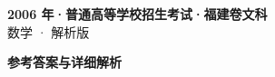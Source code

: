 \documentclass[zihao=-4, a4paper]{ctexart}
\begin{document}
\begin{center}
  {\Large\bfseries 2006 年·普通高等学校招生考试·福建卷文科}\\[4pt]
  {\large 数学 · 解析版}
\end{center}
\medskip
{}

\clearpage
{}
\begin{center}{\Large\bfseries 参考答案与详细解析}\end{center}
\medskip

\end{document}
